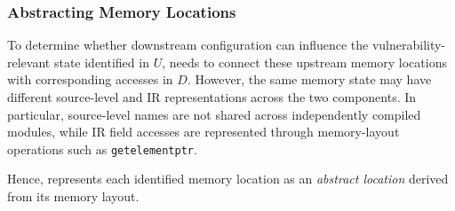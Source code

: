 






\subsubsection{Abstracting Memory Locations}\label{subsubsec:abs}
To determine whether downstream configuration can influence the vulnerability-relevant state identified in $U$, \sys needs to connect these upstream memory locations with corresponding accesses in $D$. 
However, the same memory state may have different source-level and IR representations across the two components. In particular, source-level names are not shared across independently compiled modules, while IR field accesses are represented through memory-layout operations such as \texttt{getelementptr}. 

Hence, \sys represents each identified memory location as an \textit{abstract location} derived from its memory layout.





